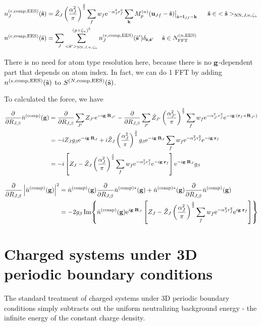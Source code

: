 \documentclass[paper=a4, fontsize=11pt]{article} %
\numberwithin{equation}{section} %
\numberwithin{figure}{section} %
\numberwithin{table}{section} %
\newcommand{\p}{\partial}
\newcommand{\bu}{{\bf{u}}}
\newcommand{\bl}{{\bf{l}}}
\newcommand{\bk}{{\bf{k}}}
\newcommand{\bs}{{\bf{s}}}
\newcommand{\bg}{{\bf{g}}}
\newcommand{\br}{{\bf{r}}}
\newcommand{\bR}{{\bf{R}}}
\newcommand{\hs}{{\hat{\bf{s}}}}
\newcommand{\rEES}{{\mathrm{EES}}}
\newcommand{\rNN}{{\mathrm{NN}}}
\newcommand{\re}{{\mathrm{e}}}
\newcommand{\rcomp}{{\mathrm{comp}}}
\newcommand{\ibgR}{i\bg\cdot\bR}
\newcommand{\al}{{\alpha}}
\newcommand{\RJb}{{R_{J,\beta}}}
\newcommand{\NFFTnEES}{{N^{(n,\rEES)}_{\mathrm{FFT}}}}
\newcommand{\pzn}{{(p+\zeta_n)^3}}
\newcommand{\hsJn}{{<\hs>_{\rNN,J,n,\zeta_n}}}
\newcommand{\hsinJn}{{\ \ \ \ \ \hs  \in  \hsJn}}
\newcommand{\hspJn}{{<\hs'>_{\rNN,J,n,\zeta_n}}}
\newcommand{\hsinnEES}{{\ \ \ \ \hs \in \NFFTnEES}}
\begin{document}
\begin{equation}
\begin{split}
n_J^{(e,\rcomp,\rEES)}(\hs) &=\tilde Z_J \left(\frac{\al_J^2}{\pi}\right)^{\frac{3}{2}}\sum_f w_f  \re^{-\al_J^2 r_f^2}\sum_{\bk}  M_p^{(n)}(\bu_{Jf}-\hat \bs)\big|_{\hs=\bl_{Jf}-\bk} \hsinJn\\
n^{(e,\rcomp,\rEES)}(\hs) &= \sum_J \sum_{\hspJn}^{\pzn} n_J^{(e,\rcomp,\rEES)}(\hs') \delta_{\hs,\hs'} \hsinnEES
\end{split}
\end{equation}

There is no need for atom type resolution here, because there is no $\bg$-dependent part that depends on atom index. In fact, we can do 1 FFT by adding $n^{(e,\rcomp,\rEES)}(\hs)$ to $S^{(N,\rcomp,\rEES)}(\hs)$.

To calculated the force, we have
\begin{equation}
\begin{split}
\frac{\p}{\p \RJb} \bar n ^{(\rcomp)}(\bg)
&= \frac{\p}{\p \RJb} \sum_{J'} Z_{J'} \re^{-\ibgR_{J'}} -  \frac{\p}{\p \RJb} \sum_{J'} \tilde Z_{J'} \left(\frac{\al_{J'}^2}{\pi}\right)^{\frac{3}{2}} \sum_f w_f \re^{-\al_{J'}^2 r_f^2} \re^{-i\bg\cdot\left(\br_f+\bR_{J'}\right)}\\
&= -iZ_J g_{\beta} \re^{-\ibgR_{J}} + i\tilde Z_J \left(\frac{\al_{J}^2}{\pi}\right)^{\frac{3}{2}} g_{\beta} \re^{-\ibgR_{J}} \sum_f w_f \re^{-\al_{J}^2 r_f^2}\re^{-i\bg\cdot \br_f }\\
&= -i\left[Z_J - \tilde Z_J  \left(\frac{\al_{J}^2}{\pi}\right)^{\frac{3}{2}}\sum_f w_f \re^{-\al_{J}^2 r_f^2}\re^{-i\bg\cdot \br_f }\right]\re^{-\ibgR_{J}}g_{\beta}
\end{split}
\end{equation}

\begin{equation}
\begin{split}
\frac{\p}{\p \RJb}\left|\bar n ^{(\rcomp)}(\bg)\right|^2
&= \bar n ^{(\rcomp)}(\bg) \frac{\p}{\p \RJb}  \bar n ^{(\rcomp)*}(\bg) + \bar n ^{(\rcomp)*}(\bg) \frac{\p}{\p \RJb}  \bar n ^{(\rcomp)}(\bg) \\
&= -2 g_{\beta}\Im{\bar n ^{(\rcomp)}(\bg) \re^{\ibgR_{J}}\left[Z_J - \tilde Z_J \left(\frac{\al_{J}^2}{\pi}\right)^{\frac{3}{2}}\sum_f w_f \re^{-\al_{J}^2 r_f^2}\re^{i\bg\cdot \br_f }\right]} 
\end{split}
\end{equation}


\newpage
\section{Charged systems under 3D periodic boundary conditions}\label{App:c3D}
The standard treatment of charged systems under 3D periodic boundary conditions simply subtracts out the uniform neutralizing background energy - the infinite energy of the constant charge density.\\
\end{document}

